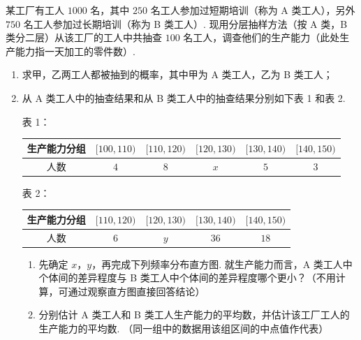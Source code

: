 \begin{problem}
某工厂有工人 \(1000\) 名，其中 \(250\) 名工人参加过短期培训（称为 A 类工人），另外 \(750\) 名工人参加过长期培训（称为 B 类工人）. 现用分层抽样方法（按 A 类，B 类分二层）从该工厂的工人中共抽查 \(100\) 名工人，调查他们的生产能力（此处生产能力指一天加工的零件数）.
\begin{enumerate}
\item 求甲，乙两工人都被抽到的概率，其中甲为 A 类工人，乙为 B 类工人；

\item 从 A 类工人中的抽查结果和从 B 类工人中的抽查结果分别如下表 1 和表 2.

\begin{center}
表 1：

\begin{tabular}{c|ccccc}
\hline
生产能力分组 & \([100,110)\) & \([110,120)\) & \([120,130)\) & \([130,140)\) & \([140,150)\) \\
\hline
人数 & \(4\) & \(8\) & \(x\) & \(5\) & \(3\) \\
\hline
\end{tabular}
\end{center}

\begin{center}
表 2：

\begin{tabular}{c|cccc}
\hline
生产能力分组 & \([110,120)\) & \([120,130)\) & \([130,140)\) & \([140,150)\) \\
\hline
人数 & \(6\) & \(y\) & \(36\) & \(18\) \\
\hline
\end{tabular}
\end{center}

\begin{enumerate}
\item 先确定 \(x\)，\(y\)，再完成下列频率分布直方图. 就生产能力而言，A 类工人中个体间的差异程度与 B 类工人中个体间的差异程度哪个更小？（不用计算，可通过观察直方图直接回答结论）
\item 分别估计 A 类工人和 B 类工人生产能力的平均数，并估计该工厂工人的生产能力的平均数. （同一组中的数据用该组区间的中点值作代表）
\end{enumerate}
\end{enumerate}

\FloatBarrier
\end{problem}

